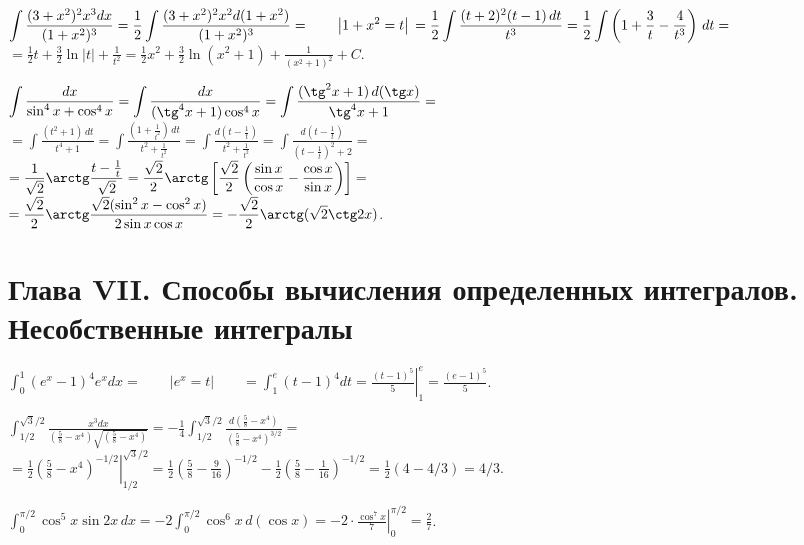 \documentclass[a5paper,10pt]{article}
\begin{document}
\medskip
{} $\displaystyle\int\frac{(3+x^2)^2x^3dx}{(1+x^2)^3}=
\frac12\int\frac{(3+x^2)^2x^2d(1+x^2)}{(1+x^2)^3}=
\qquad\left|1+x^2=t\right|\qquad\\
=\frac12\int\frac{(t+2)^2(t-1)\,dt}{t^3}=
\frac12\int\left( 1+\frac{3}{t}-\frac{4}{t^3}\right)\,dt=$\\
$\displaystyle =\frac12t+\frac32\ln|t|+\frac{1}{t^2}=
\frac12x^2+\frac32\ln(x^2+1)+\frac{1}{(x^2+1)^2}+C$.

\medskip
{} $\displaystyle\int\frac{dx}{\sin^4x+\cos^4x}=
\int\frac{dx}{(\tg^4x+1)\cos^4x}=
\int\frac{(\tg^2x+1)\,d(\tg x)}{\tg^4x+1}=$\\
$\displaystyle =\int\frac{(t^2+1)\,dt}{t^4+1}=
\int\frac{\left(1+\frac{1}{t^2}\right)\,dt}{t^2+\frac{1}{t^2}}=
\int\frac{d\left(t-\frac{1}{t}\right)}{t^2+\frac{1}{t^2}}=
\int\frac{d\left(t-\frac{1}{t}\right)}{\left(t-\frac{1}{t}\right)^2+2}=$\\
$\displaystyle =\frac{1}{\sqrt2}\arctg\frac{t-\frac{1}{t}}{\sqrt2}=
\frac{\sqrt2}{2}\arctg\left[\frac{\sqrt2}{2}
\left(\frac{\sin x}{\cos x}-\frac{\cos x}{\sin x}\right)\right]=$\\
$\displaystyle =\frac{\sqrt2}{2}\arctg\frac{\sqrt2(\sin^2x-\cos^2x)}{2\sin x\cos x}=
-\frac{\sqrt2}{2}\arctg(\sqrt2\ctg2x)$.

\medskip
\section* {Глава VII. Способы вычисления определенных интегралов. Несобственные интегралы}

\medskip
{} $\displaystyle \int_0^1(e^x-1)^4e^xdx=
\qquad\left|e^x=t\right|\qquad=\int_1^e(t-1)^4dt=
\left.\frac{(t-1)^5}{5}\right|_1^e=\frac{(e-1)^5}{5}$.

\medskip
{} $\displaystyle \int_{1/2}^{\sqrt3/2}\frac{x^3dx}
{\left(\frac58-x^4\right)\sqrt{\left(\frac58-x^4\right)}}=
-\frac14\int_{1/2}^{\sqrt3/2}\frac{d\left(\frac58-x^4\right)}
{\left(\frac58-x^4\right)^{3/2}}=$\\
$\displaystyle =\left.\frac12\left(\frac58-x^4\right)^{-1/2}\right|_{1/2}^{\sqrt3/2}=
\frac12\left(\frac58-\frac{9}{16}\right)^{-1/2}-
\frac12\left(\frac58-\frac{1}{16}\right)^{-1/2}=
\frac{1}{2}(4-4/3)=4/3$.

\medskip
{} $\displaystyle \int_{0}^{\pi/2}\cos^5x\sin2x\,dx=
-2\int_{0}^{\pi/2}\cos^6x\,d(\cos x)=
-\left.2\cdot\frac{\cos^7x}{7}\right|_{0}^{\pi/2}=\frac27$.
\end{document}
